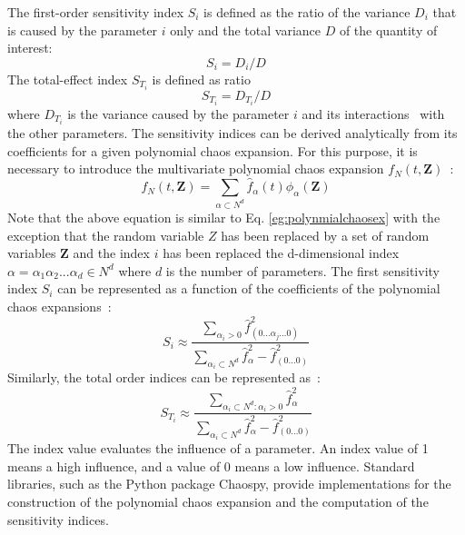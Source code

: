 The first-order sensitivity index $S_i$ is defined as the ratio of the variance $D_i$ that is caused by the parameter $i$ only and the total variance $D$ of the quantity of interest:
\begin{equation}
S_i= D_i/D
\label{eq:si}
\end{equation}
The total-effect index $S_{T_i}$ is defined as ratio
\begin{equation}
S_{T_i}= D_{T_i}/D
\label{eq:siT}
\end{equation}
where $D_{T_i}$ is the variance caused by the parameter $i$ and its interactions~\cite{saltelli-2010-math} with the other parameters. The sensitivity indices can be derived analytically from its coefficients for a given polynomial chaos expansion. For this purpose, it is necessary to introduce the multivariate polynomial chaos expansion $f_N(t,\textbf{Z})$~\cite{mara-2021-math}:
\begin{equation}
f_N(t,\textbf{Z})  = \sum_{ \alpha \subset N^d}  \hat{f}_{\alpha}(t) \phi_{\alpha}(\textbf{Z})
\label{eq:multivariate}
\end{equation}
Note that the above equation is similar to Eq. \eqref{eg:polynmialchaosex} with the exception that the random variable $Z$ has been replaced by a set of random variables $\textbf{Z}$ and the index $i$ has been replaced the d-dimensional index $\alpha=\alpha_1 \alpha_2  ... \alpha_d \in N^d $ where $d$ is the number of parameters. The first sensitivity index $S_i$ can be represented as a function of the coefficients of the polynomial chaos expansions~\cite{mara-2021-math}:
\begin{equation}
S_i \approx \frac{  \sum_{ \alpha_i  > 0 }  \hat{f}^2_{ (0 ... \alpha_j ... 0) } } { \sum_{ \alpha_i  \subset  N^d}  \hat{f}^2_{\alpha} - \hat{f}^2_{(0...0)}  }
\end{equation}
Similarly, the total order indices can be represented as~\cite{mara-2021-math}:
\begin{equation}
S_{T_i} \approx \frac{   \sum_{\alpha_i  \subset  N^d: \alpha_i  > 0 }  \hat{f}^2_{  \alpha } } {  \sum_{ \alpha_i  \subset  N^d}  \hat{f}^2_{\alpha} - \hat{f}^2_{(0...0)}  }
\end{equation}
The index value evaluates the influence of a parameter. An index value of 1 means a high influence, and a value of 0 means a low influence.
Standard libraries, such as the Python package Chaospy, provide implementations for the construction of the polynomial chaos expansion and the computation of the sensitivity indices.



